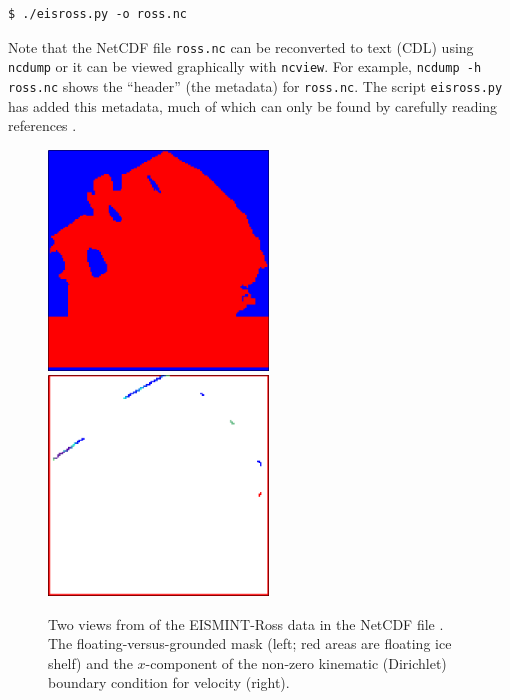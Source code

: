 \documentclass[11pt,final]{amsart}
\begin{document}
\begin{verbatim}
$ ./eisross.py -o ross.nc
\end{verbatim}
Note that the NetCDF file \verb|ross.nc| can be reconverted to text (CDL) using \verb|ncdump| or it can be viewed graphically with \verb|ncview|.  For example, \verb|ncdump -h ross.nc| shows the ``header'' (the metadata) for \verb|ross.nc|.  The script \verb|eisross.py| has added this metadata, much of which can only be found by carefully reading references \cite{RIGGS2,RIGGS1,MacAyealetal}.

\begin{figure}[ht]
\includegraphics[height=2.3in,keepaspectratio=true]{figs/rossmask} \qquad \includegraphics[height=2.3in,keepaspectratio=true]{figs/rossubar}
\caption{Two views from  of the EISMINT-Ross data in the NetCDF file .  The floating-versus-grounded mask (left; red areas are floating ice shelf) and the $x$-component of the non-zero kinematic (Dirichlet) boundary condition for velocity (right).}
\label{fig:rossmaskubar}
\end{figure}
\end{document}
